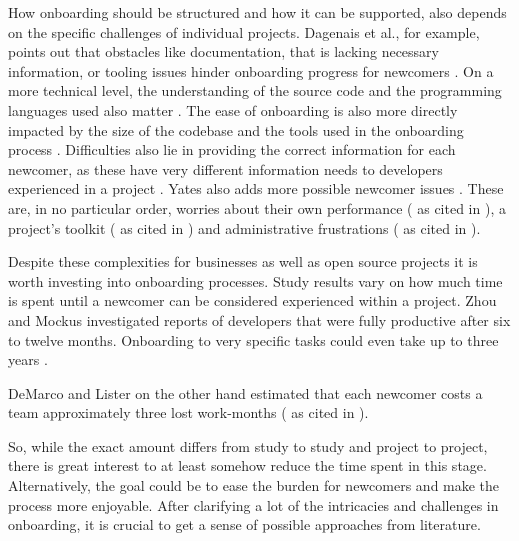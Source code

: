 How onboarding should be structured and how it can be supported, also depends on the specific challenges of individual projects. Dagenais et al., for example, points out that obstacles like documentation, that is lacking necessary information, or tooling issues hinder onboarding progress for newcomers \cite{dagenais2010moving}. On a more technical level, the understanding of the source code and the programming languages used also matter \cite{berlin1992consultants}. The ease of onboarding is also more directly impacted by the size of the codebase and the tools used in the onboarding process \cite{neville2008code}. Difficulties also lie in providing the correct information for each newcomer, as these have very different information needs to developers experienced in a project \cite{cherubini2007let}. Yates also adds more possible newcomer issues \cite[p. 35]{yates2014onboarding}. These are, in no particular order, worries about their own performance (\cite{berlin1992consultants} as cited in \cite{yates2014onboarding}), a project's toolkit (\cite{berlin1993beyond} as cited in \cite{yates2014onboarding}) and administrative frustrations (\cite{sim1998ramp} as cited in \cite{yates2014onboarding}).

Despite these complexities for businesses as well as open source projects it is worth investing into onboarding processes. Study results vary on how much time is spent until a newcomer can be considered experienced within a project. Zhou and Mockus investigated reports of developers that were fully productive after six to twelve months. Onboarding to very specific tasks could even take up to three years \cite{zhou2010developer}.

DeMarco and Lister on the other hand estimated that each newcomer costs a team approximately three lost work-months (\cite{demarco2013peopleware} as cited in \cite{yates2014onboarding}).

So, while the exact amount differs from study to study and project to project, there is great interest to at least somehow reduce the time spent in this stage. Alternatively, the goal could be to ease the burden for newcomers and make the process more enjoyable. After clarifying a lot of the intricacies and challenges in onboarding, it is crucial to get a sense of possible approaches from literature.

